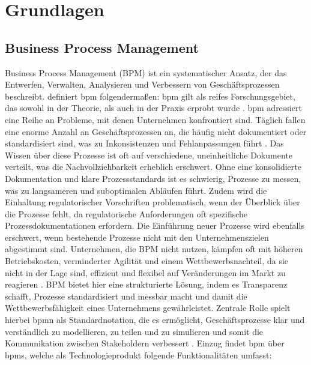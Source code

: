 \chapter{Grundlagen}
    \section{Business Process Management}
    Business Process Management (BPM) ist ein systematischer Ansatz, der das Entwerfen, Verwalten, Analysieren und Verbessern von Geschäftsprozessen beschreibt. \citet{Weske2019} definiert \gls{bpm} folgendermaßen:  \gls{bpm} gilt als reifes Forschungsgebiet, das sowohl in der Theorie, als auch in der Praxis erprobt wurde \citep{König2020RPA-BPMS}. \gls{bpm} adressiert eine Reihe an Probleme, mit denen Unternehmen konfrontiert sind. Täglich fallen eine enorme Anzahl an Geschäftsprozessen an, die häufig nicht dokumentiert oder standardisiert sind, was zu Inkonsistenzen und Fehlanpassungen führt \citep{Dumas2018}. Das Wissen über diese Prozesse ist oft auf verschiedene, uneinheitliche Dokumente verteilt, was die Nachvollziehbarkeit erheblich erschwert. Ohne eine konsolidierte Dokumentation und klare Prozessstandards ist es schwierig, Prozesse zu messen, was zu langsameren und suboptimalen Abläufen führt. Zudem wird die Einhaltung regulatorischer Vorschriften problematisch, wenn der Überblick über die Prozesse fehlt, da regulatorische Anforderungen oft spezifische Prozessdokumentationen erfordern. Die Einführung neuer Prozesse wird ebenfalls erschwert, wenn bestehende Prozesse nicht mit den Unternehmenszielen abgestimmt sind. Unternehmen, die BPM nicht nutzen, kämpfen oft mit höheren Betriebskosten, verminderter Agilität und einem Wettbewerbsnachteil, da sie nicht in der Lage sind, effizient und flexibel auf Veränderungen im Markt zu reagieren \citep{BEEREPOOT2023103837}. BPM bietet hier eine strukturierte Lösung, indem es Transparenz schafft, Prozesse standardisiert und messbar macht und damit die  Wettbewerbsfähigkeit eines Unternehmens gewährleistet. Zentrale Rolle spielt hierbei \gls{bpmn} als Standardnotation, die es ermöglicht, Geschäftsprozesse klar und verständlich zu modellieren, zu teilen und zu simulieren und somit die Kommunikation zwischen Stakeholdern verbessert \citep{Dumas2018}. Einzug findet \gls{bpm} über \gls{bpms}, welche als Technologieprodukt folgende Funktionalitäten umfasst:
